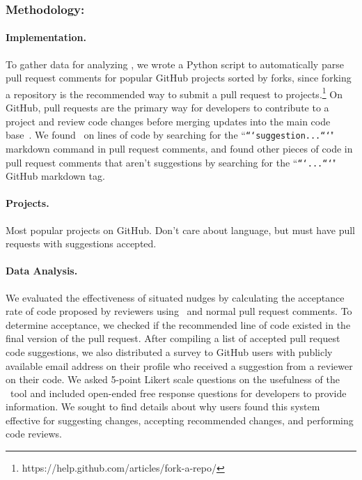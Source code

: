
\subsubsection{Methodology:}

\paragraph{Implementation.}

To gather data for analyzing \SUGGS, we wrote a Python script to automatically parse pull request comments for popular GitHub projects sorted by forks, since forking a repository is the recommended way to submit a pull request to projects.\footnote{https://help.github.com/articles/fork-a-repo/} On GitHub, pull requests are the primary way for developers to contribute to a project and review code changes before merging updates into the main code base~\cite{gousios2014pullrequests}. We found \SUGGS~on lines of code by searching for the ``\texttt{```suggestion...```}" markdown command  in pull request comments, and found other pieces of code in pull request comments that aren't suggestions by searching for the ``\texttt{```...```}" GitHub markdown tag.

\paragraph{Projects.}

Most popular projects on GitHub. Don't care about language, but must have pull requests with suggestions accepted.

\paragraph{Data Analysis.}

We evaluated the effectiveness of situated nudges by calculating the acceptance rate of code proposed by reviewers using \SUGGS~and normal pull request comments. To determine acceptance, we checked if the recommended line of code existed in the final version of the pull request. After compiling a list of accepted pull request code suggestions, we also distributed a survey to GitHub users with publicly available email address on their profile who received a suggestion from a reviewer on their code. We asked 5-point Likert scale questions on the usefulness of the \SUGGS~tool and included open-ended free response questions for developers to provide information. We sought to find details about why users found this system effective for suggesting changes, accepting recommended changes, and performing code reviews.

